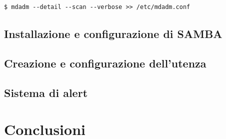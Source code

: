 \documentclass[11pt]{article}
\begin{document}
\begin{verbatim}
$ mdadm --detail --scan --verbose >> /etc/mdadm.conf
\end{verbatim}

\subsection{Installazione e configurazione di SAMBA}
\subsection{Creazione e configurazione dell'utenza}
\subsection{Sistema di alert}



\section{Conclusioni}
\end{document}
